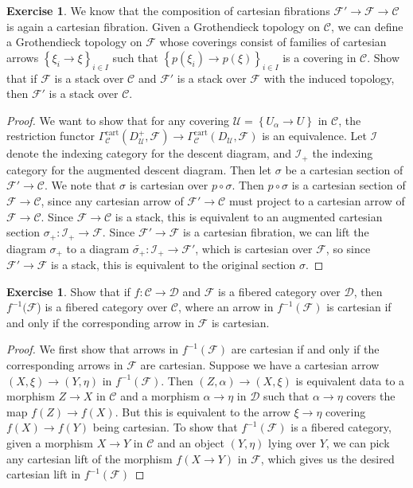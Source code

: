 \documentclass[psamsfonts, 12pt]{amsart}
\theoremstyle{definition}
\newtheorem{exer}[thm]{Exercise}
\theoremstyle{remark}
\newcommand{\inv}{^{-1}}
\newcommand{\set}[1]{\left\lbrace #1 \right\rbrace}
\begin{document}
%
\begin{exer}
We know that the composition of cartesian fibrations
$\mathcal{F}' \to \mathcal{F} \to \mathcal{C}$ is again a cartesian fibration.
Given a Grothendieck topology on $\mathcal{C}$, we can define a Grothendieck
topology on $\mathcal{F}$ whose coverings consist of families of cartesian arrows
$\set{\xi_i \to \xi}_{i \in I}$ such that $\set{p(\xi_i) \to p(\xi)}_{i \in I}$
is a covering in $\mathcal{C}$. Show that if $\mathcal{F}$ is a stack over
$\mathcal{C}$ and $\mathcal{F}'$ is a stack over $\mathcal{F}$ with the induced
topology, then $\mathcal{F}'$ is a stack over $\mathcal{C}$.
\end{exer}
%
\begin{proof}
We want to show that for any covering $\mathcal{U} = \set{U_\alpha \to U}$ in
$\mathcal{C}$, the restriction functor
$\Gamma^{\mathrm{cart}}_{\mathcal{C}}(D_{\mathcal{U}}^+,\mathcal{F})
\to \Gamma^{\mathrm{cart}}_{\mathcal{C}}(D_{\mathcal{U}},\mathcal{F})$ is an
equivalence. Let $\mathcal{I}$ denote the indexing category for the descent diagram,
and $\mathcal{I}_+$ the indexing category for the augmented descent diagram.
Then let $\sigma$ be a cartesian section of $\mathcal{F}' \to \mathcal{C}$. We
note that $\sigma$ is cartesian over $p \circ \sigma$. Then
$p \circ \sigma$ is a cartesian section of $\mathcal{F} \to \mathcal{C}$, since
any cartesian arrow of $\mathcal{F}' \to \mathcal{C}$ must project to a cartesian
arrow of $\mathcal{F} \to \mathcal{C}$. Since $\mathcal{F} \to \mathcal{C}$ is a
stack, this is equivalent to an augmented cartesian section
$\sigma_+ : \mathcal{I}_+ \to \mathcal{F}$. Since $\mathcal{F}' \to \mathcal{F}$ is
a cartesian fibration, we can lift the diagram $\sigma_+$ to a diagram
$\widetilde{\sigma_+} : \mathcal{I}_+ \to \mathcal{F}'$, which is cartesian
over $\mathcal{F}$, so since $\mathcal{F}' \to \mathcal{F}$ is a stack, this is
equivalent to the original section $\sigma$.
\end{proof}
%
\begin{exer}
Show that if $f : \mathcal{C} \to \mathcal{D}$ and $\mathcal{F}$ is a fibered category
over $\mathcal{D}$, then $f\inv(\mathcal{F}$) is a fibered category over $\mathcal{C}$,
where an arrow in $f\inv(\mathcal{F})$ is cartesian if and only if the corresponding
arrow in $\mathcal{F}$ is cartesian.
\end{exer}
%
\begin{proof}
We first show that arrows in $f\inv(\mathcal{F})$ are cartesian if and only if the
corresponding arrows in $\mathcal{F}$ are cartesian. Suppose we have a cartesian arrow
$(X,\xi) \to (Y,\eta)$ in $f\inv(\mathcal{F})$. Then
$(Z,\alpha) \to (X,\xi)$ is equivalent data to a morphism $Z \to X$ in $\mathcal{C}$
and a morphism $\alpha \to \eta$ in $\mathcal{D}$ such that $\alpha \to \eta$
covers the map $f(Z) \to f(X)$. But this is equivalent to the arrow
$\xi\to\eta$ covering $f(X) \to f(Y)$ being cartesian. To show that $f\inv(\mathcal{F})$
is a fibered category, given a morphism $X \to Y$ in $\mathcal{C}$ and an object
$(Y,\eta)$ lying over $Y$, we can pick any cartesian lift of the morphism
$f(X \to Y)$ in $\mathcal{F}$, which gives us the desired cartesian lift in
$f\inv(\mathcal{F})$
\end{proof}
\end{document}
